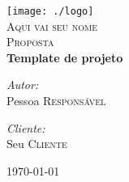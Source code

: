\begin{titlepage}
\begin{center}

\texttt{[image: ./logo]}~\\[1cm]

\textsc{\LARGE Aqui vai seu nome}\\[1.5cm]

\textsc{\Large Proposta}\\[0.5cm]

{ \huge \bfseries  Template de projeto \\[0.4cm] }



\noindent
\begin{minipage}[t]{0.4\textwidth}
\begin{flushleft} \large
\emph{Autor:}\\
Pessoa \textsc{Responsável}
\end{flushleft}
\end{minipage}%
\begin{minipage}[t]{0.4\textwidth}
\begin{flushright} \large
\emph{Cliente:} \\
Seu \textsc{Cliente}
\end{flushright}
\end{minipage}

\vfill

{\large \today}

\end{center}
\end{titlepage}